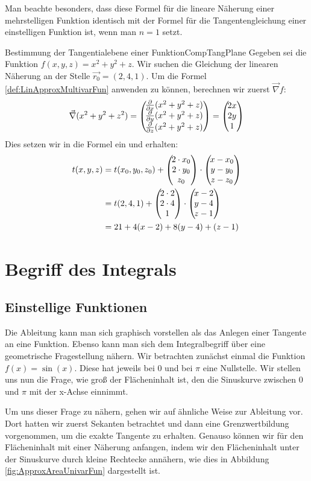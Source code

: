 Man beachte besonders, dass diese Formel für die lineare Näherung einer mehrstelligen Funktion identisch mit der Formel für die Tangentengleichung einer einstelligen Funktion ist, wenn man $n=1$ setzt.

\begin{example}{Bestimmung der Tangentialebene einer Funktion}{CompTangPlane}
    Gegeben sei die Funktion $f(x,y,z) =x^2+y^2+z$. Wir suchen die Gleichung der linearen Näherung an der Stelle $\vec{r_0} = (2,4,1)$. Um die Formel \ref{def:LinApproxMultivarFun} anwenden zu können, berechnen wir zuerst $\vec\nabla f$:
    $$
        \vec\nabla (x^2+y^2+z^2) = \left(\negthinspace\begin{matrix}\frac{\partial }{\partial x} (x^2+y^2+z)\\\frac{\partial }{\partial y} (x^2+y^2+z)\\\frac{\partial }{\partial z} (x^2+y^2+z)\end{matrix}\right) = \left(\negthinspace\begin{matrix}2x\\2y\\1\end{matrix}\right)
    $$
    Dies setzen wir in die Formel ein und erhalten:
    \begin{alignat*}{1}
        t(x,y,z) &= t(x_0,y_0,z_0) + \left(\negthinspace\begin{matrix}2\cdot x_0\\2\cdot y_0\\z_0\end{matrix}\right) \cdot \left(\negthinspace\begin{matrix}x-x_0\\y-y_0\\z-z_0\end{matrix}\right) \\
                 &= t(2,4,1) + \left(\negthinspace\begin{matrix}2\cdot 2\\2\cdot 4\\1\end{matrix}\right) \cdot \left(\negthinspace\begin{matrix}x-2\\y-4\\z-1\end{matrix}\right) \\
                 &= 21 + 4 (x-2) + 8 (y-4) + (z-1)
    \end{alignat*}
\end{example}


\section{Begriff des Integrals}

\subsection{Einstellige Funktionen}

Die Ableitung kann man sich graphisch vorstellen als das Anlegen einer Tangente an eine Funktion. Ebenso kann man sich dem Integralbegriff über eine geometrische Fragestellung nähern. Wir betrachten zunächst einmal die Funktion $f(x) = \sin(x)$. Diese hat jeweils bei $0$ und bei $\pi$ eine Nullstelle. Wir stellen uns nun die Frage, wie groß der Flächeninhalt ist, den die Sinuskurve zwischen $0$ und $\pi$ mit der x-Achse einnimmt.

Um uns dieser Frage zu nähern, gehen wir auf ähnliche Weise zur Ableitung vor. Dort hatten wir zuerst Sekanten betrachtet und dann eine Grenzwertbildung vorgenommen, um die exakte Tangente zu erhalten. Genauso können wir für den Flächeninhalt mit einer Näherung anfangen, indem wir den Flächeninhalt unter der Sinuskurve durch kleine Rechtecke annähern, wie dies in Abbildung \ref{fig:ApproxAreaUnivarFun} dargestellt ist.

